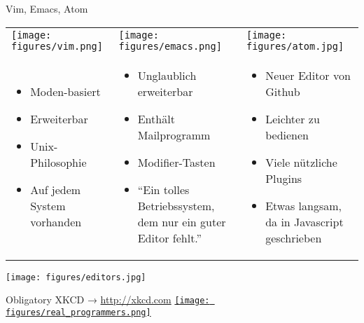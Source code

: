 \begin{frame}{Vim, Emacs, Atom}
  \begin{tabu}{@{} X[,C] @{} X[,C] @{} X[,C] @{}}
    \texttt{[image: figures/vim.png]} &
    \texttt{[image: figures/emacs.png]} &
    \texttt{[image: figures/atom.jpg]} \\
    \begin{itemize}
      \item Moden-basiert
      \item Erweiterbar
      \item Unix-Philosophie
      \item Auf jedem System vorhanden
    \end{itemize}
    &
    \begin{itemize}
      \item Unglaublich erweiterbar
      \item Enthält Mailprogramm
      \item Modifier-Tasten
      \item \enquote{Ein tolles Betriebssystem, dem nur ein guter Editor fehlt.}
    \end{itemize}
    &
    \begin{itemize}
      \item Neuer Editor von Github
      \item Leichter zu bedienen
      \item Viele nützliche Plugins
      \item Etwas langsam, da in Javascript geschrieben
    \end{itemize}
  \end{tabu}
\end{frame}

\begin{frame}
  \centering
  \texttt{[image: figures/editors.jpg]}
\end{frame}

\begin{frame}{Obligatory XKCD → \url{http://xkcd.com}}
  \centering
  \href{http://xkcd.com/378/}{\texttt{[image: figures/real\_programmers.png]}}
\end{frame}
